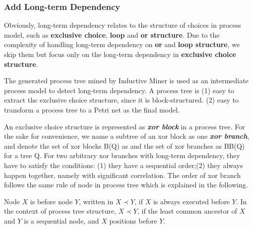 \subsubsection{Add Long-term Dependency}
Obviously, long-term dependency relates to the structure of choices in process model, such as \textbf{exclusive choice}, \textbf{loop} and \textbf{or structure}. Due to the complexity of handling long-term dependency on \textbf{or} and \textbf{loop structure}, we skip them but focus only on the long-term dependency in \textbf{exclusive choice structure}. 

The generated process tree mined by Inductive Miner is used as an intermediate process model to detect long-term dependency.  A process tree is  (1) easy to extract the exclusive choice structure, since it is block-structured. (2) easy to transform a process tree to a Petri net as the final model.

An exclusive choice structure is represented as \textbf{\emph{xor block}} in a process tree. For the sake for convenience, we name a subtree of an xor block as one \textbf{\emph{xor branch}}, and denote the set of xor blocks B(Q) as and the set of xor branches as BB(Q) for a tree Q.
For two arbitrary xor branches with long-term dependency, they have to satisfy the conditions: (1) they have a sequential order;(2) they always happen together, namely with significant correlation.
The order of xor branch follows the same rule of node in process tree which is explained in the following.
\begin{definition}
	Node $X$ is before node $Y$, written in $X \prec Y$, if $X$ is always executed before $Y$.  In the context of process tree structure, $X \prec Y$, if the least common ancestor of $X$ and $Y$ is a sequential node, and $X$ positions before $Y$.
\end{definition} 


